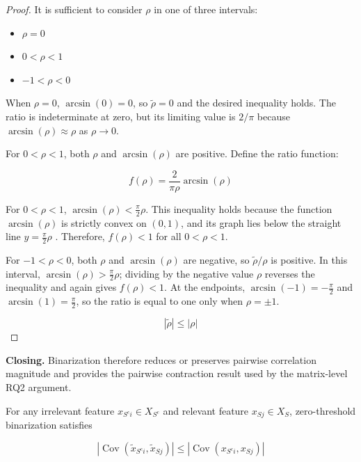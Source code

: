 \begin{proof}

It is sufficient to consider $ \rho $ in one of three intervals:
\begin{itemize}
	\setlength\itemsep{-0.5em} %
	\item [1.] $ \rho = 0 $
	\item [2.] $ 0 < \rho < 1 $
	\item [3.] $ -1 < \rho < 0 $	
\end{itemize}

When $ \rho = 0 $, $ \arcsin(0) = 0 $, so $ \tilde{\rho} = 0 $ and the desired inequality holds. The ratio is indeterminate at zero, but its limiting value is $ 2/\pi $ because $ \arcsin(\rho) \approx \rho $ as $ \rho \to 0 $.

For $ 0 < \rho < 1 $, both $ \rho $ and $ \arcsin(\rho) $ are positive. Define the ratio function:

\begin{equation}\label{eq:app-lemma2-ratio-function}
f(\rho) = \frac{2}{\pi \rho} \arcsin(\rho)
\end{equation}

For $ 0 < \rho < 1 $, $ \arcsin(\rho) < \frac{\pi}{2} \rho $. This inequality holds because the function $ \arcsin(\rho) $ is strictly convex on $ (0, 1) $, and its graph lies below the straight line $ y = \frac{\pi}{2} \rho $ \cite{JOrender2025Efficient}. Therefore, $ f(\rho) < 1 $ for all $ 0 < \rho < 1 $.

For $ -1 < \rho < 0 $, both $ \rho $ and $ \arcsin(\rho) $ are negative, so $ \tilde{\rho}/\rho $ is positive. In this interval, $ \arcsin(\rho) > \frac{\pi}{2} \rho $; dividing by the negative value $ \rho $ reverses the inequality and again gives $ f(\rho) < 1 $. At the endpoints, $ \arcsin(-1) = -\frac{\pi}{2} $ and $ \arcsin(1) = \frac{\pi}{2} $, so the ratio is equal to one only when $ \rho = \pm 1 $.

\begin{equation}\label{eq:app-lemma2-final-correlation-contraction}
| \tilde{\rho} | \leq | \rho |
\end{equation}
\end{proof}

\noindent\textbf{Closing.}
Binarization therefore reduces or preserves pairwise correlation magnitude and provides the pairwise contraction result used by the matrix-level RQ2 argument.


\begin{lemma}\label{lem:app-covariance-contraction}
For any irrelevant feature $ x_{{S^c}i} \in X_{S^c} $ and relevant feature $ x_{Sj} \in X_S $, zero-threshold binarization satisfies

\begin{equation}\label{eq:app-lemma3-covariance-contraction}
\left| \operatorname{Cov}(\tilde{x}_{{S^c}i}, \tilde{x}_{Sj}) \right| \leq \left| \operatorname{Cov}(x_{{S^c}i}, x_{Sj}) \right|
\end{equation}
\end{lemma}


